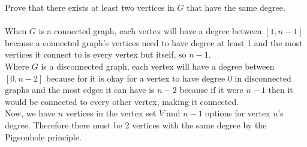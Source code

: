 \documentclass{article}
\begin{document}
\begin{enumerate}
			Prove that there exists at least two vertices in $G$ that have the same degree. \\
			\\
			When $G$ is a connected graph, each vertex will have a degree between $[1, n - 1]$ because a connected graph's vertices need to have degree at least 1 and the most vertices it connect to is every vertex but itself, so $n - 1$. \\
			Where $G$ is a disconnected graph, each vertex will have a degree between $[0, n - 2]$ because for it is okay for a vertex to have degree 0 in disconnected graphs and the most edges it can have is $n - 2$ because if it were $n - 1$ then it would be connected to every other vertex, making it connected. \\
			Now, we have $n$ vertices in the vertex set $V$ and $n - 1$ options for vertex $u$'s degree. Therefore there must be 2 vertices with the same degree by the Pigeonhole principle.
	\end{enumerate}	
\end{document}
